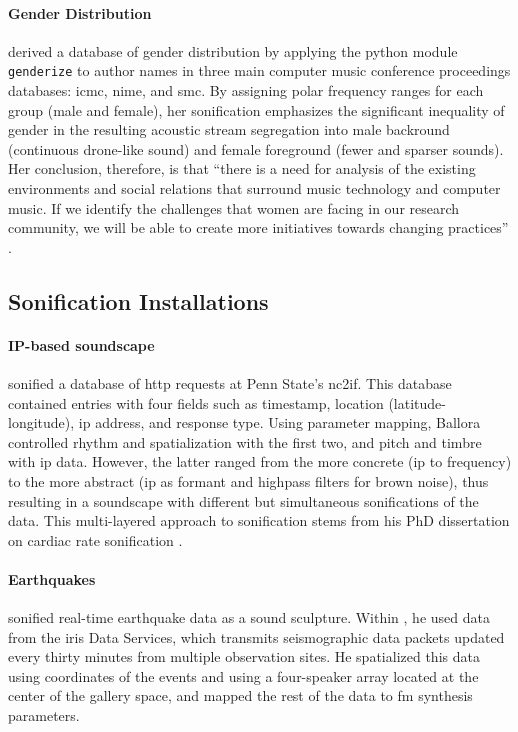 \paragraph{Gender Distribution}
\textcite{Fri17:Son} derived a database of gender distribution by applying the python module \texttt{genderize} to author names in three main computer music conference proceedings databases: \gls{icmc}, \gls{nime}, and \gls{smc}. By assigning polar frequency ranges for each group (male and female), her sonification emphasizes the significant inequality of gender in the resulting acoustic stream segregation into male backround (continuous drone-like sound) and female foreground (fewer and sparser sounds). Her conclusion, therefore, is that ``there is a need for analysis of the existing environments and social relations that surround music technology and computer music. If we identify the challenges that women are facing in our research community, we will be able to create more initiatives towards changing practices'' \parencite[238]{Fri17:Son}.

\subsection{Sonification Installations}
\label{sonification:installations}

% 
% 

\paragraph{IP-based soundscape}
\textcite{icmc/bbp2372.2010.117} sonified a database of \gls{http} requests at Penn State's \gls{nc2if}. This database contained entries with four fields such as timestamp, location (latitude-longitude), \gls{ip} address, and response type. Using parameter mapping, Ballora controlled rhythm and spatialization with the first two, and pitch and timbre with \gls{ip} data. However, the latter ranged from the more concrete (\gls{ip} to frequency) to the more abstract (\gls{ip} as formant and highpass filters for brown noise), thus resulting in a soundscape with different but simultaneous sonifications of the data. This multi-layered approach to sonification stems from his PhD dissertation on cardiac rate sonification \parencite{Ballora/2000/phdthesis}.

\paragraph{Earthquakes}
\textcite{icmc/bbp2372.2017.033} sonified real-time earthquake data as a sound sculpture. Within , he used data from the \gls{iris} Data Services, which transmits seismographic data packets updated every thirty minutes from multiple observation sites. He spatialized this data using coordinates of the events and using a four-speaker array located at the center of the gallery space, and mapped the rest of the data to \gls{fm} synthesis parameters.

